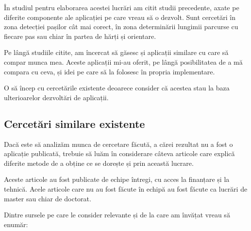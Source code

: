 \documentclass[12pt,a4paper]{article}
\begin{document}
În studiul pentru elaborarea acestei lucrări am citit studii precedente, axate pe diferite componente ale aplicației pe care vreau să o dezvolt. Sunt cercetări în zona detecției pașilor cât mai corect, în zona determinării lungimii parcurse cu fiecare pas sau chiar în partea de hărți și orientare.

Pe lângă studiile citite, am încercat să găsesc și aplicații similare cu care să compar munca mea. Aceste aplicații mi-au oferit, pe lângă posibilitatea de a mă compara cu ceva, și idei pe care să la folosesc în propria implementare.

O să încep cu cercetările existente deoarece consider că acestea stau la baza ulterioarelor dezvoltări de aplicații.

\subsection{Cercetări similare existente}
Dacă este să analizăm munca de cercetare făcută, a cărei rezultat nu a fost o aplicație publicată, trebuie să luăm în considerare câteva articole care explică diferite metode de a obține ce se dorește și prin această lucrare.

Aceste articole au fost publicate de echipe întregi, cu acces la finanțare și la tehnică. Acele articole care nu au fost făcute în echipă au fost făcute ca lucrări de master sau chiar de doctorat. %

Dintre sursele pe care le consider relevante și de la care am învățat vreau să enumăr:
 
\end{document}
